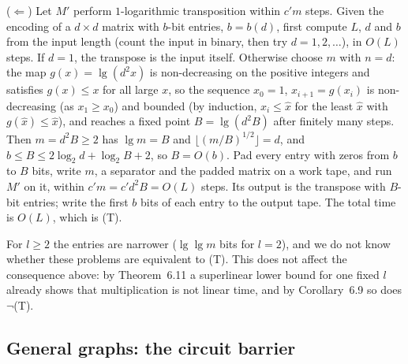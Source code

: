 \begin{informalproof}
($\Leftarrow$) Let $M'$ perform $1$-logarithmic transposition within $c'm$ steps. Given the encoding of a
$d\times d$ matrix with $b$-bit entries, $b=b(d)$, first compute $L$, $d$ and $b$ from the input length
(count the input in binary, then try $d=1,2,\dots$), in $O(L)$ steps. If $d=1$, the transpose is the input itself. Otherwise choose $m$ with $n=d$: the map
$g(x)=\lg(d^2x)$ is non-decreasing on the positive integers and satisfies $g(x)\le x$ for all large $x$, so the sequence $x_0=1$, $x_{i+1}=g(x_i)$ is non-decreasing (as $x_1\ge x_0$) and bounded (by induction, $x_i\le\hat x$ for the least $\hat x$ with $g(\hat x)\le\hat x$), and reaches a fixed point $B=\lg(d^2B)$
after finitely many steps. Then $m=d^2B\ge2$ has $\lg m=B$ and $\lfloor(m/B)^{1/2}\rfloor=d$, and
$b\le B\le2\log_2d+\log_2B+2$, so $B=O(b)$. Pad every entry with zeros from $b$ to $B$ bits, write $m$, a
separator and the padded matrix on a work tape, and run $M'$ on it, within $c'm=c'd^2B=O(L)$ steps. Its
output is the transpose with $B$-bit entries; write the first $b$ bits of each entry to the output tape. The
total time is $O(L)$, which is (T).
\end{informalproof}

For $l\ge2$ the entries are narrower ($\lg\lg m$ bits for $l=2$), and we do not know whether these problems
are equivalent to (T). This does not affect the consequence above: by Theorem~6.11 a superlinear lower bound
for one fixed $l$ already shows that multiplication is not linear time, and by Corollary~6.9 so does
$\neg$(T).

\subsection{General graphs: the circuit barrier}

